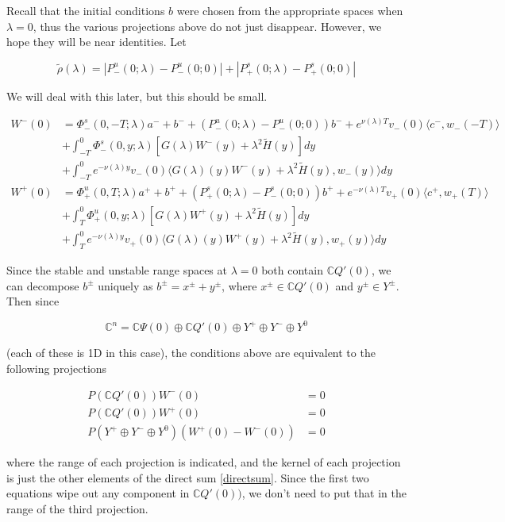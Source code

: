 \documentclass[12pt]{article}
\def\C{{\mathbb C}}
\begin{document}
\begin{enumerate}
Recall that the initial conditions $b$ were chosen from the appropriate spaces when $\lambda = 0$, thus the various projections above do not just disappear. However, we hope they will be near identities. Let

\[
\tilde{\rho}(\lambda) = |P^u_-(0;\lambda) - P^u_-(0; 0)| + |P^s_+(0;\lambda) - P^s_+(0;0)|
\]

We will deal with this later, but this should be small.

\begin{align*}
W^-(0) &= \Phi^s_-(0, -T; \lambda )a^- + b^- + (P^u_-(0; \lambda) - P^u_-(0; 0))b^- + e^{\nu(\lambda)T} v_-(0) \langle c^-, w_-(-T) \rangle \\
&+ \int_{-T}^0 \Phi^s_-(0, y; \lambda) [ G(\lambda)W^-(y) + \lambda^2 \tilde{H}(y) ] dy \\
&+ \int_{-T}^0 
e^{-\nu(\lambda)y} v_-(0) \langle G(\lambda)(y)W^-(y) + \lambda^2 \tilde{H}(y), w_-(y) \rangle dy \\
W^+(0) &= \Phi^u_+(0, T; \lambda)a^+ + b^+ + (P^s_+(0; \lambda) - P^s_-(0; 0))b^+ + e^{-\nu(\lambda)T} v_+(0) \langle c^+, w_+(T) \rangle \\
&+ \int_T^0 \Phi^u_+(0, y; \lambda) [ G(\lambda)W^+(y) + \lambda^2 \tilde{H}(y) ] dy \\
&+ \int_T^0 e^{-\nu(\lambda)y} v_+(0) \langle G(\lambda)(y)W^+(y) + \lambda^2 \tilde{H}(y), w_+(y) \rangle dy
\end{align*}

Since the stable and unstable range spaces at $\lambda = 0$ both contain $\C Q'(0)$, we can decompose $b^\pm$ uniquely as $b^\pm = x^\pm + y^\pm$, where $x^\pm \in \C Q'(0)$ and $y^\pm \in Y^\pm$. Then since

\begin{equation}\label{directsum}
\C^n = \C\Psi(0) \oplus \C Q'(0) \oplus Y^+ \oplus Y^- \oplus Y^0
\end{equation}

(each of these is 1D in this case), the conditions above are equivalent to the following projections

\begin{align*}
P(\C Q'(0))W^-(0) &= 0 \\
P(\C Q'(0))W^+(0) &= 0 \\
P(Y^+ \oplus Y^- \oplus Y^0) (W^+(0) - W^-(0) ) &= 0
\end{align*}

where the range of each projection is indicated, and the kernel of each projection is just the other elements of the direct sum \eqref{directsum}. Since the first two equations wipe out any component in $\C Q'(0))$, we don't need to put that in the range of the third projection. \\


\end{enumerate}
\end{document}
